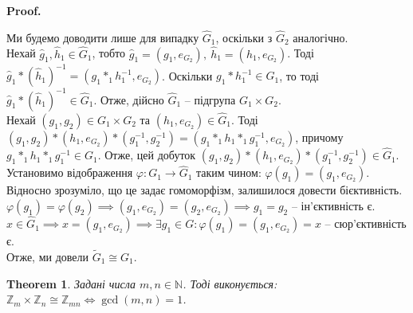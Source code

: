 \documentclass[a4paper, 10pt]{article}
\makeatletter
\theoremstyle{theoremdd}
\newtheorem{theorem}{Theorem}[subsection]
\theoremstyle{theoremdd}
\theoremstyle{theoremdd}
\theoremstyle{theoremdd}
\theoremstyle{theoremdd}
\theoremstyle{theoremdd}
\theoremstyle{theoremdd}
\theoremstyle{theoremdd}
\theoremstyle{theoremdd}
\theoremstyle{theoremdd}
\theoremstyle{theoremdd}
\theoremstyle{theoremdd}
\theoremstyle{theoremdd}
\theoremstyle{theoremdd}
\theoremstyle{theoremdd}
\renewenvironment{proof}[1][Proof.\\]{\par
\pushQED{\hfill \qed}%
\normalfont \topsep6\p@\@plus6\p@\relax
\trivlist
\item\relax
{\bfseries
#1\@addpunct{.}}\hspace\labelsep\ignorespaces
}{%
\popQED\endtrivlist\@endpefalse
}
\makeatother
\begin{document}
\begin{proof}
Ми будемо доводити лише для випадку $\hat{G}_1$, оскільки з $\hat{G}_2$ аналогічно.\\
Нехай $\hat{g}_1, \hat{h}_1 \in \hat{G}_1$, тобто $\hat{g}_1 = (g_1, e_{G_2}),\ \hat{h}_1 = (h_1, e_{G_2})$. Тоді $\hat{g}_1 * (\hat{h}_1)^{-1} = (g_1 *_1 h_1^{-1}, e_{G_2})$. Оскільки $g_1 * h_1^{-1} \in G_1$, то тоді $\hat{g}_1 * (\hat{h}_1)^{-1} \in \hat{G}_1$. Отже, дійсно $\hat{G}_1$ -- підгрупа $G_1 \times G_2$.\\
Нехай $(g_1,g_2) \in G_1 \times G_2$ та $(h_1,e_{G_2}) \in \hat{G}_1$. Тоді\\
$(g_1,g_2)*(h_1,e_{G_2})*(g_1^{-1},g_2^{-1}) = (g_1*_1 h_1 *_1 g_1^{-1}, e_{G_2})$, причому $g_1*_1 h_1 *_1 g_1^{-1} \in G_1$. Отже, цей добуток $(g_1,g_2)*(h_1,e_{G_2})*(g_1^{-1},g_2^{-1}) \in \hat{G}_1$.\\
Установимо відображення $\varphi \colon G_1 \to \hat{G}_1$ таким чином: $\varphi(g_1) = (g_1,e_{G_2})$. Відносно зрозуміло, що це задає гомоморфізм, залишилося довести бієктивність.\\
$\varphi(g_1) = \varphi(g_2) \implies (g_1,e_{G_2}) = (g_2,e_{G_2}) \implies g_1 = g_2$ -- ін'єктивність є.\\
$x \in \hat{G}_1 \implies x = (g_1,e_{G_2}) \implies \exists g_1 \in G: \varphi(g_1) = (g_1,e_{G_2}) = x$ -- сюр'єктивність є.\\
Отже, ми довели $\tilde{G}_1 \cong G_1$.
\end{proof}

\begin{theorem}
Задані числа $m,n \in \mathbb{N}$. Тоді виконується:\\
$\mathbb{Z}_m \times \mathbb{Z}_n \cong \mathbb{Z}_{mn} \iff \gcd(m,n) = 1$.
\end{theorem}
\end{document}
